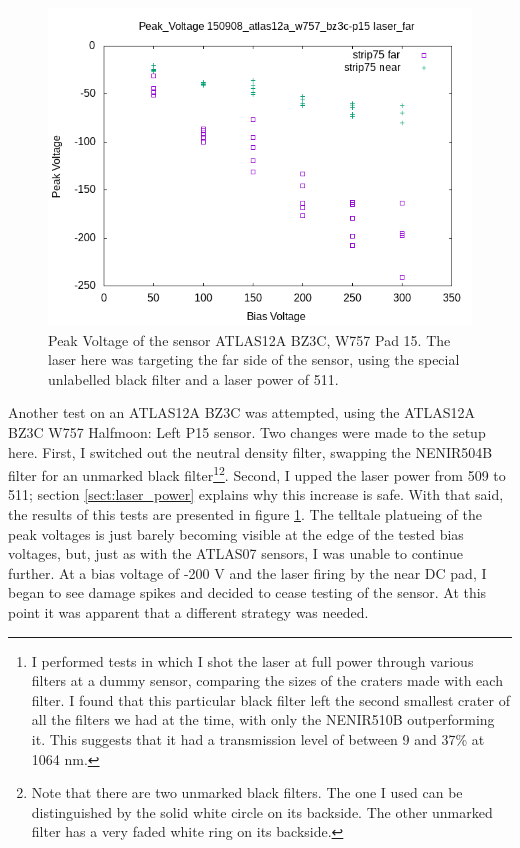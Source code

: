 \documentclass{report}
\begin{document}
            
            \begin{figure}[h] 
                \includegraphics[height=.4\textheight]{Peak_Voltage__150908_atlas12a_w757_bz3c-p15__laser_far}
                \centering
                \caption{ Peak Voltage of the sensor ATLAS12A BZ3C, W757 Pad 15. The laser here was targeting the far side of the sensor, using the special unlabelled black filter and a laser power of 511. }
                \label{fig:Peak_Voltage__150908_atlas12a_w757_bz3c-p15__laser_far}
            \end{figure}

            Another test on an ATLAS12A BZ3C was attempted, using the ATLAS12A BZ3C W757 Halfmoon: Left P15 sensor. Two changes were made to the setup here. First, I switched out the neutral density filter, swapping the NENIR504B filter for an unmarked black filter\footnote{I performed tests in which I shot the laser at full power through various filters at a dummy sensor, comparing the sizes of the craters made with each filter. I found that this particular black filter left the second smallest crater of all the filters we had at the time, with only the NENIR510B outperforming it. This suggests that it had a transmission level of between 9 and 37\% at 1064 nm.}\footnote{Note that there are two unmarked black filters. The one I used can be distinguished by the solid white circle on its backside. The other unmarked filter has a very faded white ring on its backside.}. Second, I upped the laser power from 509 to 511; section \ref{sect:laser_power} explains why this increase is safe. With that said, the results of this tests are presented in figure \ref{fig:Peak_Voltage__150908_atlas12a_w757_bz3c-p15__laser_far}. The telltale platueing of the peak voltages is just barely becoming visible at the edge of the tested bias voltages, but, just as with the ATLAS07 sensors, I was unable to continue further. At a bias voltage of -200 V and the laser firing by the near DC pad, I began to see damage spikes and decided to cease testing of the sensor. At this point it was apparent that a different strategy was needed.
            
\end{document}
